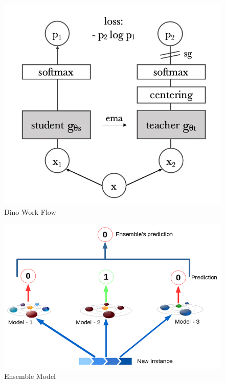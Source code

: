 \begin{itemize}
\begin{figure}
        \includegraphics[scale=.35]{figures/dino2.png}
        \caption{Dino Work Flow \cite{caron2021emerging}}
        \label{fig:my_label}
    \end{figure}
\end{itemize}


\begin{figure}
    \centering
    \includegraphics[scale=.5]{figures/ensemble-model.png}
    \caption{Ensemble Model \cite{huang2017densely}}
    \label{fig:my_label}
\end{figure}

